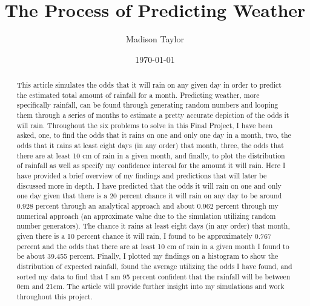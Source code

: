 \documentclass[twocolumn]{revtex4}
\begin{document}
\title{
The Process of Predicting Weather
}

\author{Madison Taylor}

\date{\today}

\begin{abstract}
	
	This article simulates the odds that it will rain on any given day in order to predict the estimated total amount of rainfall for a month. Predicting weather, more specifically rainfall, can be found through generating random numbers and looping them through a series of months to estimate a pretty accurate depiction of the odds it will rain. Throughout the six problems to solve in this Final Project, I have been asked, one,  to find the odds that it rains on one and only one day in a month, two, the odds that it rains at least eight days (in any order) that month, three, the odds that there are at least 10 cm of rain in a given month, and finally, to plot the distribution of rainfall as well as specify my confidence interval for the amount it will rain. Here I have provided a brief overview of my findings and predictions that will later be discussed more in depth. I have predicted that the odds it will rain on one and only one day given that there is a 20 percent chance it will rain on any day to be around 0.928 percent through an analytical approach and about 0.962 percent through my numerical approach (an approximate value due to the simulation utilizing random number generators). The chance it rains at least eight days (in any order) that month, given there is a 10 percent chance it will rain, I found to be approximately 0.767 percent and the odds that there are at least 10 cm of rain in a given month I found to be about 39.455 percent. Finally, I plotted my findings on a histogram to show the distribution of expected rainfall, found the average utilizing the odds I have found, and sorted my data to find that I am 95 percent confident that the rainfall will be between 0cm and 21cm. The article will provide further insight into my simulations and work throughout this project. 
	
\end{abstract}

\maketitle
\end{document}
